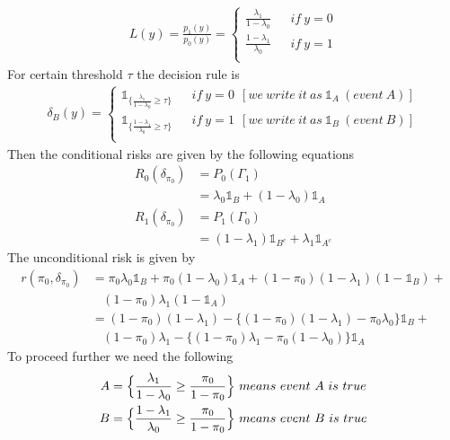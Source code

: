 \documentclass[a4paper,english,12pt]{article}
\begin{document}
\begin{exmp}
\begin{eqnarray}
L(y) = \frac{p_1(y)}{p_0(y)} =
								\begin{cases}
								\frac{\lambda_1}{1-\lambda_0} ~~~~~~~if~ y=0 \\
								\frac{1-\lambda_1}{\lambda_0} ~~~~~~~if~ y=1\\
								\end{cases} 
\end{eqnarray}
For certain threshold $\tau$ the decision rule is
\begin{eqnarray}
\delta_{B}(y)= 
				\begin{cases} \mathds{1}_{\bigl\{\frac{\lambda_1}{1-\lambda_0}\geq\tau\bigr\}} ~~~~~~~if~ y=0~~[we~write~it~as~ \mathds{1}_{A}~(event~A)]\\
				\mathds{1}_{\bigl\{\frac{1-\lambda_1}{\lambda_0}\geq\tau\bigr\}} ~~~~~~~if~ y=1~~[we~write~it~as ~\mathds{1}_{B}~(event~B)]\\
				\end{cases}
\end{eqnarray}
Then the conditional risks are given by the following equations
\begin{align}
R_{0}(\delta_{\pi_{0}})&=P_{0}(\Gamma_{1})\nonumber\\
					   &=\lambda_{0}\mathds{1}_{B}+(1-\lambda_{0})\mathds{1}_{A}\\
R_{1}(\delta_{\pi_{0}})&=P_{1}(\Gamma_{0})\nonumber\\
					   &=(1-\lambda_{1})\mathds{1}_{B^{c}}+\lambda_{1}\mathds{1}_{A^{c}}
\end{align}
The unconditional risk is given by
\begin{align}
r(\pi_{0},\delta_{\pi_{0}})&=\pi_{0}\lambda_{0}\mathds{1}_{B}+\pi_{0}(1-\lambda_{0})\mathds{1}_{A}+(1-\pi_{0})(1-\lambda_{1})(1-\mathds{1}_{B})+\nonumber\\
						   &~~~~(1-\pi_{0})\lambda_{1}(1-\mathds{1}_{A})\nonumber\\
						   &=(1-\pi_{0})(1-\lambda_{1})-{\{(1-\pi_{0})(1-\lambda_{1})-\pi_{0}\lambda_{0}\}}\mathds{1}_{B}+\nonumber\\
						   &~~~~(1-\pi_{0})\lambda_{1}-{\{(1-\pi_{0})\lambda_{1}-\pi_{0}(1-\lambda_{0})\}}\mathds{1}_{A}
\end{align}
To proceed further we need the following 
\begin{align}
A&=\Bigl\{\frac{\lambda_{1}}{1-\lambda_{0}}\geq\dfrac{\pi_{0}}{1-\pi_{0}}\Bigr\}~means~event~A~is~true\nonumber\\
B&=\Bigl\{\frac{1-\lambda_{1}}{\lambda_{0}}\geq\dfrac{\pi_{0}}{1-\pi_{0}}\Bigr\}~means~event~B~is~true\nonumber

\end{align}
\end{exmp}
\end{document}
